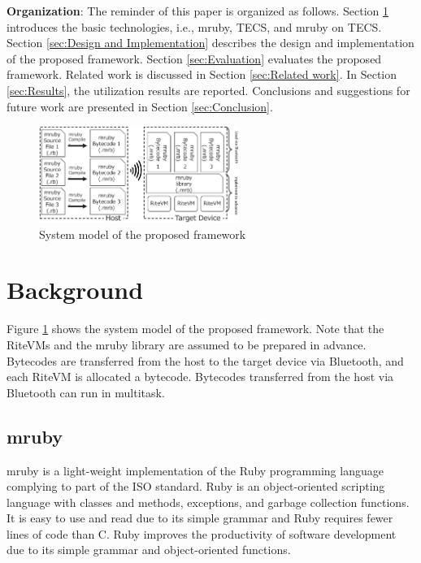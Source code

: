 \documentclass[S,R,E]{article/compsoft}
\begin{document}
{\bf Organization}: The reminder of this paper is organized as follows.
Section \ref{sec:Background} introduces the basic technologies, i.e., mruby, TECS, and mruby on TECS.
Section \ref{sec:Design and Implementation} describes the design and implementation of the proposed framework.
Section \ref{sec:Evaluation} evaluates the proposed framework.
Related work is discussed in Section \ref{sec:Related work}.
In Section \ref{sec:Results}, the utilization results are reported.
Conclusions and suggestions for future work are presented in Section \ref{sec:Conclusion}.


\begin{figure}[t]
    \centering
    \includegraphics[width=6.5cm,clip]{figure/proposed.eps}
    \caption{System model of the proposed framework}
    \label{fig:proposed}
\end{figure}

\section{Background}
\label{sec:Background}
Figure \ref{fig:proposed} shows the system model of the proposed framework.
Note that the RiteVMs and the mruby library are assumed to be prepared in advance.
Bytecodes are transferred from the host to the target device via Bluetooth, and each RiteVM is allocated a bytecode.
Bytecodes transferred from the host via Bluetooth can run in multitask.

\subsection{mruby}
\label{sec:mruby}
mruby is a light-weight implementation of the Ruby programming language complying to part of the ISO standard.
Ruby is an object-oriented scripting language \cite{url:Ruby} with classes and methods, exceptions, and garbage collection functions.
It is easy to use and read due to its simple grammar and Ruby requires fewer lines of code than C.
Ruby improves the productivity of software development due to its simple grammar and object-oriented functions.
\end{document}
